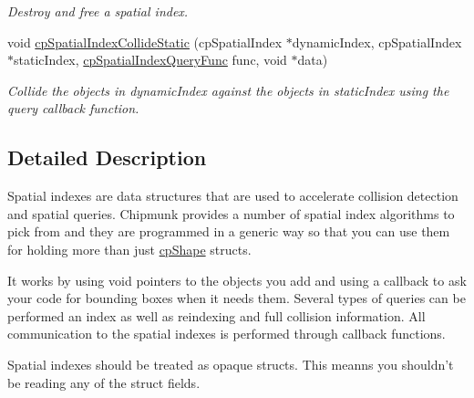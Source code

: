 \begin{DoxyCompactItemize}
\begin{DoxyCompactList}\small\item\em Destroy and free a spatial index. \end{DoxyCompactList}\item 
\hypertarget{group__cp_spatial_index_ga8abb667968f231b2f87c7273d4b0e533}{void \hyperlink{group__cp_spatial_index_ga8abb667968f231b2f87c7273d4b0e533}{cp\-Spatial\-Index\-Collide\-Static} (cp\-Spatial\-Index $\ast$dynamic\-Index, cp\-Spatial\-Index $\ast$static\-Index, \hyperlink{group__cp_spatial_index_ga4885d6b7a5f9f613a19a25e1c7ec5073}{cp\-Spatial\-Index\-Query\-Func} func, void $\ast$data)}\label{group__cp_spatial_index_ga8abb667968f231b2f87c7273d4b0e533}

\begin{DoxyCompactList}\small\item\em Collide the objects in {\ttfamily dynamic\-Index} against the objects in {\ttfamily static\-Index} using the query callback function. \end{DoxyCompactList}\end{DoxyCompactItemize}


\subsection{Detailed Description}
Spatial indexes are data structures that are used to accelerate collision detection and spatial queries. Chipmunk provides a number of spatial index algorithms to pick from and they are programmed in a generic way so that you can use them for holding more than just \hyperlink{structcp_shape}{cp\-Shape} structs.

It works by using {\ttfamily void} pointers to the objects you add and using a callback to ask your code for bounding boxes when it needs them. Several types of queries can be performed an index as well as reindexing and full collision information. All communication to the spatial indexes is performed through callback functions.

Spatial indexes should be treated as opaque structs. This meanns you shouldn't be reading any of the struct fields. 

